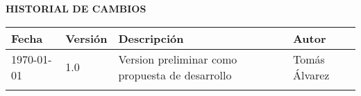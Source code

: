 
\textbf{HISTORIAL DE CAMBIOS}
\begin{table}[ht]
\centering
\begin{tabular}{|l|l|p{5cm}|p{4cm}|}\hline
Fecha & Versión & Descripción & Autor\\ \hline
\today & 1.0 & Version preliminar como propuesta de desarrollo & Tomás Álvarez\\
\hline
 & & & \\
\hline
\end{tabular}
\end{table}
